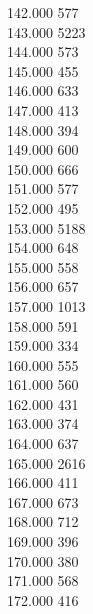 { 142.000	577 \\
 143.000	5223 \\
 144.000	573 \\
 145.000	455 \\
 146.000	633 \\
 147.000	413 \\
 148.000	394 \\
 149.000	600 \\
 150.000	666 \\
 151.000	577 \\
 152.000	495 \\
 153.000	5188 \\
 154.000	648 \\
 155.000	558 \\
 156.000	657 \\
 157.000	1013 \\
 158.000	591 \\
 159.000	334 \\
 160.000	555 \\
 161.000	560 \\
 162.000	431 \\
 163.000	374 \\
 164.000	637 \\
 165.000	2616 \\
 166.000	411 \\
 167.000	673 \\
 168.000	712 \\
 169.000	396 \\
 170.000	380 \\
 171.000	568 \\
 172.000	416 \\
}
